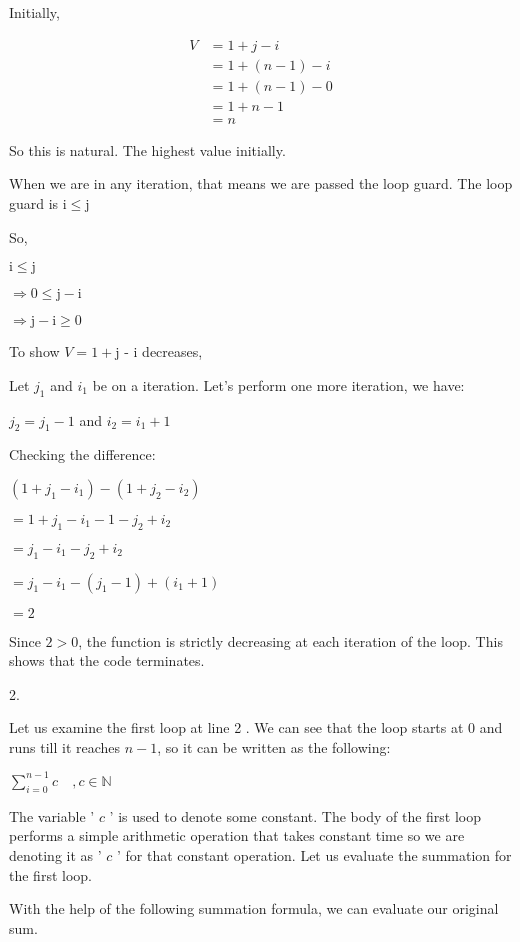 \documentclass[10pt]{article}
\begin{document}
Initially,

$$
\begin{aligned}
V & =1+j-i \\
& =1+(n-1)-i \\
& =1+(n-1)-0 \\
& =1+n-1 \\
& =n
\end{aligned}
$$

So this is natural. The highest value initially.

When we are in any iteration, that means we are passed the loop guard. The loop guard is $\mathrm{i} \leq \mathrm{j}$

So,

$\mathrm{i} \leq \mathrm{j}$

$\Rightarrow 0 \leq \mathrm{j}-\mathrm{i}$

$\Rightarrow \mathrm{j}-\mathrm{i} \geq 0$

To show $V=1+\mathrm{j}$ - $\mathrm{i}$ decreases,

Let $j_{1}$ and $i_{1}$ be on a iteration. Let's perform one more iteration, we have:

$j_{2}=j_{1}-1$ and $i_{2}=i_{1}+1$

Checking the difference:

$\left(1+j_{1}-i_{1}\right)-\left(1+j_{2}-i_{2}\right)$

$=1+j_{1}-i_{1}-1-j_{2}+i_{2}$

$=j_{1}-i_{1}-j_{2}+i_{2}$

$=j_{1}-i_{1}-\left(j_{1}-1\right)+\left(i_{1}+1\right)$

$=2$

Since $2>0$, the function is strictly decreasing at each iteration of the loop. This shows that the code terminates.

2.

Let us examine the first loop at line 2 . We can see that the loop starts at 0 and runs till it reaches $n-1$, so it can be written as the following:

$\sum_{i=0}^{n-1} c \quad, c \in \mathbb{N}$

The variable ' $c$ ' is used to denote some constant. The body of the first loop performs a simple arithmetic operation that takes constant time so we are denoting it as ' $c$ ' for that constant operation. Let us evaluate the summation for the first loop.

With the help of the following summation formula, we can evaluate our original sum.
\end{document}
